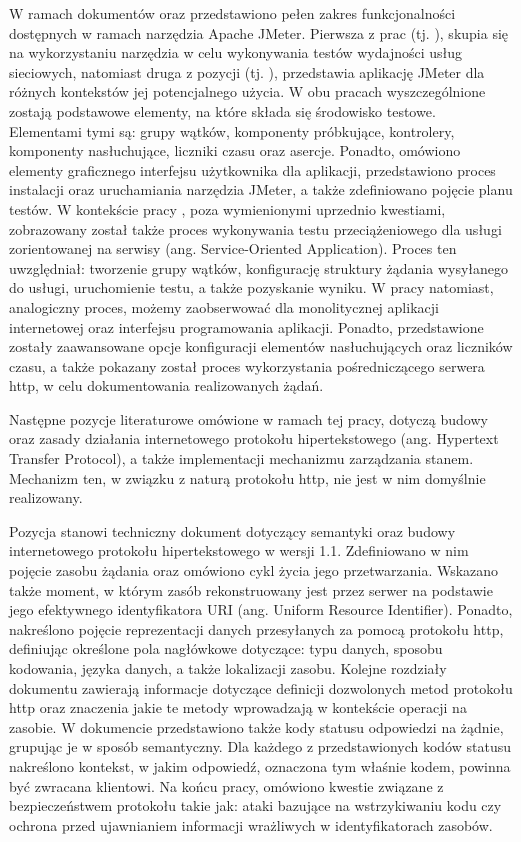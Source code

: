 W ramach dokumentów \cite{nevedrov2006using} oraz \cite{halili2008apache} przedstawiono pełen zakres funkcjonalności dostępnych w ramach narzędzia Apache JMeter. Pierwsza z prac (tj. \cite{nevedrov2006using}), skupia się na wykorzystaniu narzędzia w celu wykonywania testów wydajności usług sieciowych, natomiast druga z pozycji (tj. \cite{halili2008apache}), przedstawia aplikację JMeter dla różnych kontekstów jej potencjalnego użycia. W obu pracach wyszczególnione zostają podstawowe elementy, na które składa się środowisko testowe. Elementami tymi są: grupy wątków, komponenty próbkujące, kontrolery, komponenty nasłuchujące, liczniki czasu oraz asercje. Ponadto,  omówiono elementy graficznego interfejsu użytkownika dla aplikacji, przedstawiono proces instalacji oraz uruchamiania narzędzia JMeter, a także zdefiniowano pojęcie planu testów. W kontekście pracy \cite{nevedrov2006using}, poza wymienionymi uprzednio kwestiami, zobrazowany został także proces wykonywania testu przeciążeniowego dla usługi zorientowanej na serwisy (ang. Service-Oriented Application). Proces ten uwzględniał: tworzenie grupy wątków, konfigurację struktury żądania wysyłanego do usługi, uruchomienie testu, a także pozyskanie wyniku. W pracy \cite{halili2008apache} natomiast, analogiczny proces, możemy zaobserwować dla monolitycznej aplikacji internetowej oraz interfejsu programowania aplikacji. Ponadto, przedstawione zostały zaawansowane opcje konfiguracji elementów nasłuchujących oraz liczników czasu, a także pokazany został proces wykorzystania pośredniczącego serwera http, w celu dokumentowania realizowanych żądań.

Następne pozycje literaturowe omówione w ramach tej pracy, dotyczą budowy oraz zasady działania internetowego protokołu hipertekstowego (ang. Hypertext Transfer Protocol), a także implementacji mechanizmu zarządzania stanem. Mechanizm ten, w związku z naturą protokołu http, nie jest w nim domyślnie realizowany.

Pozycja \cite{fielding2014hypertext} stanowi techniczny dokument dotyczący semantyki oraz budowy internetowego protokołu hipertekstowego w wersji 1.1. Zdefiniowano w nim pojęcie zasobu żądania oraz omówiono cykl życia jego przetwarzania. Wskazano także moment, w którym zasób rekonstruowany jest przez serwer na podstawie jego efektywnego identyfikatora URI (ang. Uniform Resource Identifier). Ponadto, nakreślono pojęcie reprezentacji danych przesyłanych za pomocą protokołu http, definiując określone pola nagłówkowe dotyczące: typu danych, sposobu kodowania, języka danych, a także lokalizacji zasobu. Kolejne rozdziały dokumentu zawierają informacje dotyczące definicji dozwolonych metod protokołu http oraz znaczenia jakie te metody wprowadzają w kontekście operacji na zasobie. W dokumencie przedstawiono także kody statusu odpowiedzi na żądnie, grupując je w sposób semantyczny. Dla każdego z przedstawionych kodów statusu nakreślono kontekst, w jakim odpowiedź, oznaczona tym właśnie kodem, powinna być zwracana klientowi. Na końcu pracy, omówiono kwestie związane z bezpieczeństwem protokołu takie jak: ataki bazujące na wstrzykiwaniu kodu czy ochrona przed ujawnianiem informacji wrażliwych w identyfikatorach zasobów.

